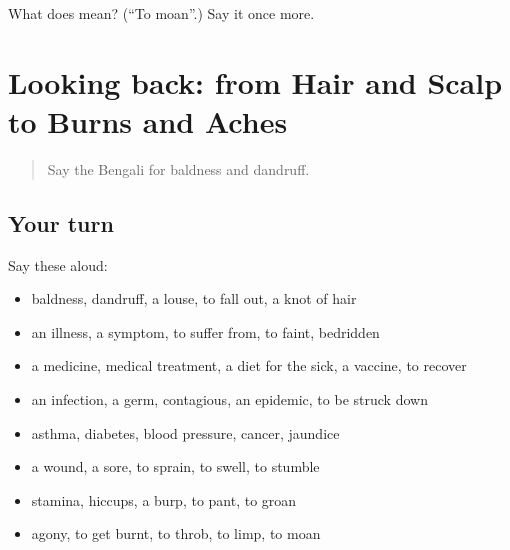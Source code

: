 \begin{tcolorbox}[breakable,colback=teal!4,colframe=teal!35!black,title={Before you move on}]
What does  mean? (\textquotedblleft{}To moan\textquotedblright{}.) Say it once more.
\end{tcolorbox}
\section[(dialogue)]{Looking back: from Hair and Scalp to Burns and Aches}

\label{lesson:BN-R477-review-470-477}



\begin{quote}
Say the Bengali for baldness and dandruff.
\end{quote}

\subsection*{Your turn}
Say these aloud:

\begin{itemize}
\raggedright
  \item baldness, dandruff, a louse, to fall out, a knot of hair
  \item an illness, a symptom, to suffer from, to faint, bedridden
  \item a medicine, medical treatment, a diet for the sick, a vaccine, to recover
  \item an infection, a germ, contagious, an epidemic, to be struck down
  \item asthma, diabetes, blood pressure, cancer, jaundice
  \item a wound, a sore, to sprain, to swell, to stumble
  \item stamina, hiccups, a burp, to pant, to groan
  \item agony, to get burnt, to throb, to limp, to moan
\end{itemize}

